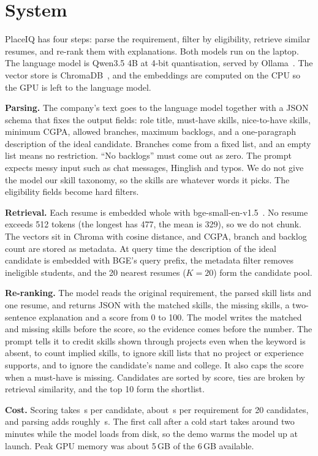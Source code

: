 \documentclass[conference]{IEEEtran}
\begin{document}
\section{System}
PlaceIQ has four steps: parse the requirement, filter by eligibility, retrieve similar resumes, and re-rank them with explanations. Both models run on the laptop. The language model is Qwen3.5 4B at 4-bit quantisation, served by Ollama~\cite{ollama,qwen35ollama}. The vector store is ChromaDB~\cite{chroma}, and the embeddings are computed on the CPU so the GPU is left to the language model.

\textbf{Parsing.} The company's text goes to the language model together with a JSON schema that fixes the output fields: role title, must-have skills, nice-to-have skills, minimum CGPA, allowed branches, maximum backlogs, and a one-paragraph description of the ideal candidate. Branches come from a fixed list, and an empty list means no restriction. ``No backlogs'' must come out as zero. The prompt expects messy input such as chat messages, Hinglish and typos. We do not give the model our skill taxonomy, so the skills are whatever words it picks. The eligibility fields become hard filters.

\textbf{Retrieval.} Each resume is embedded whole with bge-small-en-v1.5~\cite{xiao2024cpack}. No resume exceeds 512 tokens (the longest has 477, the mean is 329), so we do not chunk. The vectors sit in Chroma with cosine distance, and CGPA, branch and backlog count are stored as metadata. At query time the description of the ideal candidate is embedded with BGE's query prefix, the metadata filter removes ineligible students, and the 20 nearest resumes ($K=20$) form the candidate pool.

\textbf{Re-ranking.} The model reads the original requirement, the parsed skill lists and one resume, and returns JSON with the matched skills, the missing skills, a two-sentence explanation and a score from 0 to 100. The model writes the matched and missing skills before the score, so the evidence comes before the number. The prompt tells it to credit skills shown through projects even when the keyword is absent, to count implied skills, to ignore skill lists that no project or experience supports, and to ignore the candidate's name and college. It also caps the score when a must-have is missing. Candidates are sorted by score, ties are broken by retrieval similarity, and the top 10 form the shortlist.

\textbf{Cost.} Scoring takes \TimePerCandidate{}\,s per candidate, about \TimeRerankPerReq{}\,s per requirement for 20 candidates, and parsing adds roughly \TimeParse{}\,s. The first call after a cold start takes around two minutes while the model loads from disk, so the demo warms the model up at launch. Peak GPU memory was about 5\,GB of the 6\,GB available.
\end{document}
